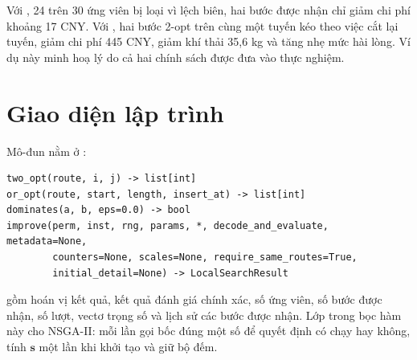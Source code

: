Với , 24 trên 30 ứng viên bị loại vì lệch biên, hai bước được nhận chỉ giảm chi phí
khoảng 17 CNY. Với , hai bước 2-opt trên cùng một tuyến kéo theo việc cắt lại
tuyến, giảm chi phí 445 CNY, giảm khí thải 35,6 kg và tăng nhẹ mức hài lòng. Ví dụ này minh hoạ lý do
cả hai chính sách được đưa vào thực nghiệm.

\section{Giao diện lập trình}

Mô-đun nằm ở :
\begin{Verbatim}
two_opt(route, i, j) -> list[int]
or_opt(route, start, length, insert_at) -> list[int]
dominates(a, b, eps=0.0) -> bool
improve(perm, inst, rng, params, *, decode_and_evaluate, metadata=None,
        counters=None, scales=None, require_same_routes=True,
        initial_detail=None) -> LocalSearchResult
\end{Verbatim}
 gồm hoán vị kết quả, kết quả đánh giá chính xác, số ứng viên, số bước được
nhận, số lượt, vectơ trọng số và lịch sử các bước được nhận. Lớp  trong
 bọc hàm này cho NSGA-II: mỗi lần gọi bốc đúng một số để quyết định có chạy hay
không, tính $\mathbf{s}$ một lần khi khởi tạo và giữ bộ đếm.
